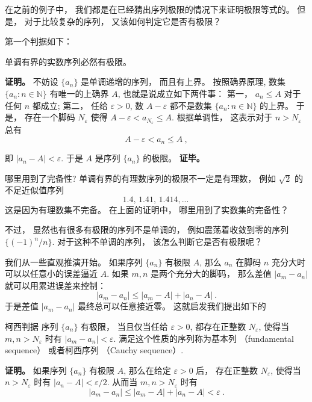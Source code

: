 

在之前的例子中， 我们都是在已经猜出序列极限的情况下来证明极限等式的。 但是， 对于比较复杂的序列， 又该如何判定它是否有极限？

第一个判据如下：

\begin{theorem}{}
单调有界的实数序列必然有极限。
\end{theorem}
\textbf{证明。} 不妨设 $\{a_n\}$ 是单调递增的序列， 而且有上界。 按照确界原理, 数集 $\{a_n:n\in\mathbb{N}\}$ 有唯一的上确界 $A$, 也就是说成立如下两件事： 第一， $a_n\leq A$ 对于任何 $n$ 都成立; 第二， 任给 $\varepsilon>0$, 数 $A-\varepsilon$ 都不是数集 $\{a_n:n\in\mathbb{N}\}$ 的上界。 于是， 存在一个脚码 $N_\varepsilon$ 使得 $A-\varepsilon<a_{N_\varepsilon}\leq A$. 根据单调性， 这表示对于 $n>N_\varepsilon$ 总有
\begin{equation}
A-\varepsilon<a_n\leq A~,
\end{equation}




即 $|a_n-A|<\varepsilon$. 于是 $A$ 是序列 $\{a_n\}$ 的极限。 \textbf{证毕。}

\begin{exercise}{哪里用到了完备性?}
单调有界的有理数序列的极限不一定是有理数， 例如 $\sqrt{2}$ 的不足近似值序列
$$
1.4,\,1.41,\,1.414,...~
$$
这是因为有理数集不完备。 在上面的证明中， 哪里用到了实数集的完备性？
\end{exercise}

不过， 显然也有很多有极限的序列不是单调的， 例如震荡着收敛到零的序列 $\{(-1)^n/n\}$. 对于这种不单调的序列， 该怎么判断它是否有极限呢？

我们从一些直观推演开始。 如果序列 $\{a_n\}$ 有极限 $A$, 那么 $a_n$ 在脚码 $n$ 充分大时可以以任意小的误差逼近 $A$. 如果 $m,n$ 是两个充分大的脚码， 那么差值 $|a_m-a_n|$ 就可以用累进误差来控制：
$$
|a_m-a_n|\leq |a_m-A|+|a_n-A|~.
$$
于是差值 $|a_m-a_n|$ 最终总可以任意接近零。 这就启发我们提出如下的

\begin{theorem}{柯西判据}
序列 $\{a_n\}$ 有极限， 当且仅当任给 $\varepsilon>0$, 都存在正整数 $N_\varepsilon$, 使得当 $m,n>N_\varepsilon$ 时有 $|a_m-a_n|<\varepsilon$. 满足这个性质的序列称为基本列 （fundamental sequence） 或者柯西序列 （Cauchy sequence）.
\end{theorem}

\textbf{证明。} 如果序列 $\{a_n\}$ 有极限 $A$, 那么在给定 $\varepsilon>0$ 后， 存在正整数 $N_\varepsilon$, 使得当 $n>N_\varepsilon$ 时有 $|a_n-A|<\varepsilon/2$. 从而当 $m,n>N_\varepsilon$ 时有
$$
|a_m-a_n|\leq|a_m-A|+|a_n-A|<\varepsilon~.
$$


